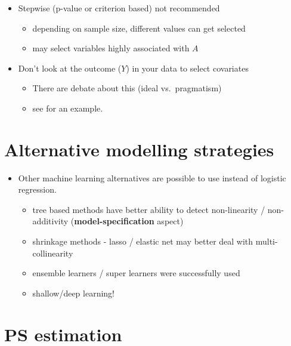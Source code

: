 \documentclass[
]{book}
\providecommand{\tightlist}{%
  \setlength{\itemsep}{0pt}\setlength{\parskip}{0pt}}
\begin{document}
\begin{itemize}
\tightlist
\item
  Stepwise (p-value or criterion based) not recommended

  \begin{itemize}
  \tightlist
  \item
    depending on sample size, different values can get selected
  \item
    may select variables highly associated with \(A\)
  \end{itemize}
\item
  Don't look at the outcome (\(Y\)) in your data to select covariates

  \begin{itemize}
  \tightlist
  \item
    There are debate about this (ideal vs.~pragmatism)
  \item
    see \citet{karim2018can} for an example.
  \end{itemize}
\end{itemize}

\hypertarget{alternative-modelling-strategies}{%
\section{Alternative modelling strategies}\label{alternative-modelling-strategies}}

\begin{itemize}
\tightlist
\item
  Other machine learning alternatives are possible to use instead of logistic regression.

  \begin{itemize}
  \tightlist
  \item
    tree based methods have better ability to detect non-linearity / non-additivity (\textbf{model-specification} aspect)
  \item
    shrinkage methods - lasso / elastic net may better deal with multi-collinearity
  \item
    ensemble learners / super learners were successfully used
  \item
    shallow/deep learning!
  \end{itemize}
\end{itemize}

\hypertarget{ps-estimation}{%
\section{PS estimation}\label{ps-estimation}}
\end{document}
